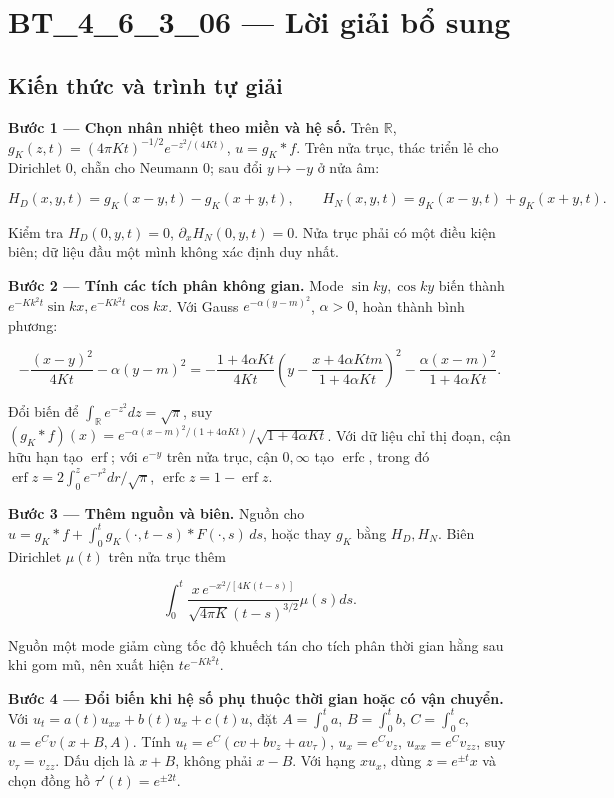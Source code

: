 \documentclass[10pt,a4paper]{article}
\begin{document}
\section*{BT\_4\_6\_3\_06 — Lời giải bổ sung}
\subsection*{Kiến thức và trình tự giải}
\textbf{Bước 1 — Chọn nhân nhiệt theo miền và hệ số.} Trên $\mathbb R$, $g_K(z,t)=(4\pi Kt)^{-1/2}e^{-z^2/(4Kt)}$, $u=g_K*f$. Trên nửa trục, thác triển lẻ cho Dirichlet $0$, chẵn cho Neumann $0$; sau đổi $y\mapsto-y$ ở nửa âm:


\[
H_D(x,y,t)=g_K(x-y,t)-g_K(x+y,t),\qquad
H_N(x,y,t)=g_K(x-y,t)+g_K(x+y,t).
\]


Kiểm tra $H_D(0,y,t)=0$, $\partial_xH_N(0,y,t)=0$. Nửa trục phải có một điều kiện biên; dữ liệu đầu một mình không xác định duy nhất.

\textbf{Bước 2 — Tính các tích phân không gian.} Mode $\sin ky,\cos ky$ biến thành $e^{-Kk^2t}\sin kx,e^{-Kk^2t}\cos kx$. Với Gauss $e^{-\alpha(y-m)^2}$, $\alpha>0$, hoàn thành bình phương:


\[
-\frac{(x-y)^2}{4Kt}-\alpha(y-m)^2
=-\frac{1+4\alpha Kt}{4Kt}\left(y-\frac{x+4\alpha Ktm}{1+4\alpha Kt}\right)^2
-\frac{\alpha(x-m)^2}{1+4\alpha Kt}.
\]


Đổi biến để $\int_{\mathbb R}e^{-z^2}dz=\sqrt\pi$, suy $(g_K*f)(x)=e^{-\alpha(x-m)^2/(1+4\alpha Kt)}/\sqrt{1+4\alpha Kt}$. Với dữ liệu chỉ thị đoạn, cận hữu hạn tạo $\operatorname{erf}$; với $e^{-y}$ trên nửa trục, cận $0,\infty$ tạo $\operatorname{erfc}$, trong đó $\operatorname{erf}z=2\int_0^ze^{-r^2}dr/\sqrt\pi$, $\operatorname{erfc}z=1-\operatorname{erf}z$.

\textbf{Bước 3 — Thêm nguồn và biên.} Nguồn cho $u=g_K*f+\int_0^tg_K(\cdot,t-s)*F(\cdot,s)\,ds$, hoặc thay $g_K$ bằng $H_D,H_N$. Biên Dirichlet $\mu(t)$ trên nửa trục thêm


\[
\int_0^t\frac{x\,e^{-x^2/[4K(t-s)]}}{\sqrt{4\pi K}(t-s)^{3/2}}\mu(s)ds.
\]


Nguồn một mode giảm cùng tốc độ khuếch tán cho tích phân thời gian hằng sau khi gom mũ, nên xuất hiện $te^{-Kk^2t}$.

\textbf{Bước 4 — Đổi biến khi hệ số phụ thuộc thời gian hoặc có vận chuyển.} Với $u_t=a(t)u_{xx}+b(t)u_x+c(t)u$, đặt $A=\int_0^ta$, $B=\int_0^tb$, $C=\int_0^tc$, $u=e^Cv(x+B,A)$. Tính $u_t=e^C(cv+bv_z+av_\tau)$, $u_x=e^Cv_z$, $u_{xx}=e^Cv_{zz}$, suy $v_\tau=v_{zz}$. Dấu dịch là $x+B$, không phải $x-B$. Với hạng $xu_x$, dùng $z=e^{\pm t}x$ và chọn đồng hồ $\tau'(t)=e^{\pm2t}$.
\end{document}
